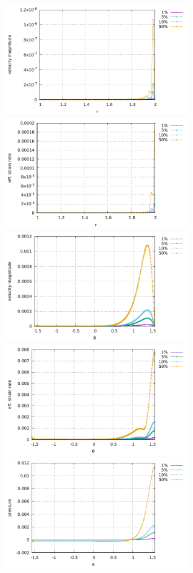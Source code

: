 \begin{center}
\includegraphics[width=8cm]{python_codes/fieldstone_152/results/exp3_axisymmetric/vel_left}
\includegraphics[width=8cm]{python_codes/fieldstone_152/results/exp3_axisymmetric/sr2_left}\\
\includegraphics[width=8cm]{python_codes/fieldstone_152/results/exp3_axisymmetric/vel_R2}
\includegraphics[width=8cm]{python_codes/fieldstone_152/results/exp3_axisymmetric/sr2_R2}\\
\includegraphics[width=8cm]{python_codes/fieldstone_152/results/exp3_axisymmetric/p_R2}

\end{center}
